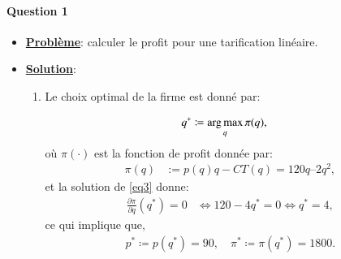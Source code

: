     \begin{frame}
[allowframebreaks]{\insertsection}
\framesubtitle{Question 1\\}
\begin{itemize}
\item \textbf{\underline{Problème}}: calculer le profit pour une tarification linéaire.
 
\item \textbf{\underline{Solution}}:

\begin{enumerate}[$\cdot$]
\item Le choix optimal de la firme est donné par:

\begin{align}
q^* &\coloneqq \argmax_q \pi(q),
\label{eq3}
\end{align}
où  $\pi(\cdot)$ est la fonction de profit donnée par:
\begin{align*}
\pi(q) &:= p(q)q - CT(q) = 120q – 2q^2,
\end{align*}
et la solution de \eqref{eq3}  donne:
\begin{align*}
\frac{\partial \pi}{\partial q}(q^*) = 0 &\Leftrightarrow 120-4q^* = 0 \Leftrightarrow q^* = 4,
\end{align*}
ce qui implique que,
\begin{align*}
p^* \coloneqq p(q^*) = 90, \quad \pi^* \coloneqq \pi(q^*) = 1800.
\end{align*}

\end{enumerate}
\end{itemize}

 \end{frame}


